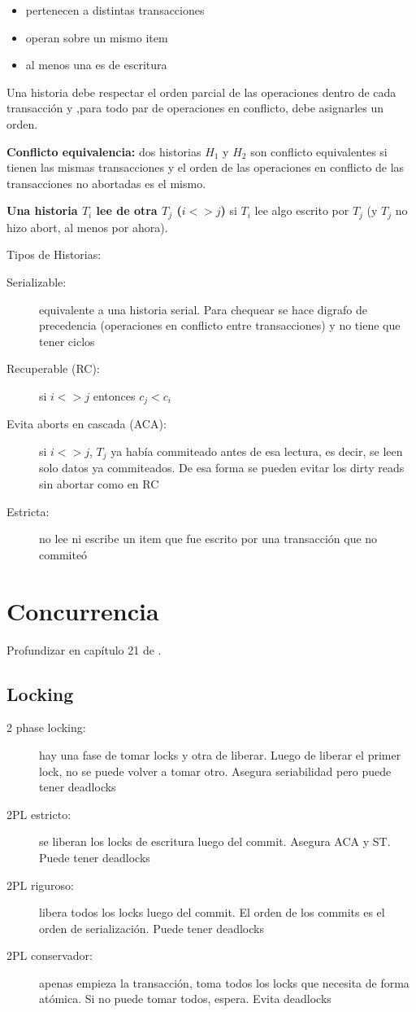\begin{itemize}
	\item pertenecen a distintas transacciones
	\item operan sobre un mismo item
	\item al menos una es de escritura
\end{itemize}

Una historia debe respectar el orden parcial de las operaciones dentro de cada transacción y ,para todo par de operaciones en conflicto, debe asignarles un orden.

\textbf{Conflicto equivalencia:} dos historias $H_1$ y $H_2$ son conflicto equivalentes si tienen las mismas transacciones y el orden de las operaciones en conflicto de las transacciones no abortadas es el mismo.

\textbf{Una historia $T_i$ lee de otra $T_j$ ($i <> j$)} si $T_i$ lee algo escrito por $T_j$ (y $T_j$ no hizo abort, al menos por ahora).

Tipos de Historias:

\begin{description}
	\item[Serializable:] equivalente a una historia serial. Para chequear se hace digrafo de precedencia (operaciones en conflicto entre transacciones) y no tiene que tener ciclos
	\item[Recuperable (RC):] si $i <> j$ entonces $c_j < c_i$
	\item[Evita aborts en cascada (ACA):] si $i <> j$, $T_j$ ya había commiteado antes de esa lectura, es decir, se leen solo datos ya commiteados. De esa forma se pueden evitar los dirty reads sin abortar como en RC
	\item[Estricta:] no lee ni escribe un item que fue escrito por una transacción que no commiteó
\end{description}

\section{Concurrencia}

Profundizar en capítulo 21 de \cite{elmasri2015}.

\subsection{Locking}

\begin{description}
	\item[2 phase locking:] hay una fase de tomar locks y otra de liberar. Luego de liberar el primer lock, no se puede volver a tomar otro. Asegura seriabilidad pero puede tener deadlocks
	\item[2PL estricto:] se liberan los locks de escritura luego del commit. Asegura ACA y ST. Puede tener deadlocks
	\item[2PL riguroso:] libera todos los locks luego del commit. El orden de los commits es el orden de serialización. Puede tener deadlocks
	\item[2PL conservador:] apenas empieza la transacción, toma todos los locks que necesita de forma atómica. Si no puede tomar todos, espera. Evita deadlocks
\end{description}

